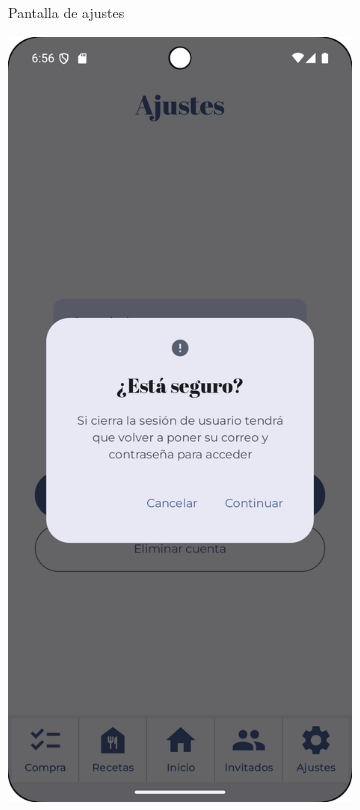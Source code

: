 \begin{figure}[H]
\begin{subfigure}[b]{0.3\textwidth}
      \caption{Pantalla de ajustes}
      \label{fig:settings-main}
    \end{subfigure}
    \hfill
    \begin{subfigure}[b]{0.3\textwidth}
      \includegraphics[width=\textwidth]{./img/manual/sign_out_confirm.png}

\end{subfigure}
\end{figure}

